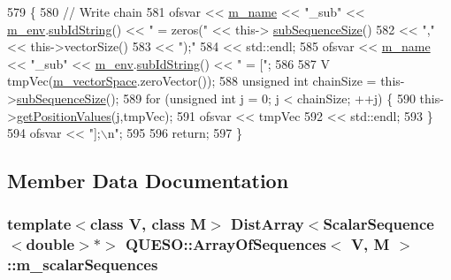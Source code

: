 \begin{DoxyCode}
579 \{
580   \textcolor{comment}{// Write chain}
581   ofsvar << \hyperlink{class_q_u_e_s_o_1_1_base_vector_sequence_a3c379b2f7c20a2a1dd083ea43fca1494}{m\_name} << \textcolor{stringliteral}{"\_sub"} << \hyperlink{class_q_u_e_s_o_1_1_base_vector_sequence_a8e8824d2a63c5a43bcc6473e3a0491e8}{m\_env}.\hyperlink{class_q_u_e_s_o_1_1_base_environment_a73f7849acdd5d5ba15a3094fe18f258f}{subIdString}() << \textcolor{stringliteral}{" = zeros("} << this->
      \hyperlink{class_q_u_e_s_o_1_1_array_of_sequences_a007d00d2398007b9bac82ed23eedb1e2}{subSequenceSize}()
582          << \textcolor{stringliteral}{","}                                                    << this->vectorSize()
583          << \textcolor{stringliteral}{");"}
584          << std::endl;
585   ofsvar << \hyperlink{class_q_u_e_s_o_1_1_base_vector_sequence_a3c379b2f7c20a2a1dd083ea43fca1494}{m\_name} << \textcolor{stringliteral}{"\_sub"} << \hyperlink{class_q_u_e_s_o_1_1_base_vector_sequence_a8e8824d2a63c5a43bcc6473e3a0491e8}{m\_env}.\hyperlink{class_q_u_e_s_o_1_1_base_environment_a73f7849acdd5d5ba15a3094fe18f258f}{subIdString}() << \textcolor{stringliteral}{" = ["};
586 
587   V tmpVec(\hyperlink{class_q_u_e_s_o_1_1_base_vector_sequence_a4bd171e39ed050ff105c808336f35198}{m\_vectorSpace}.zeroVector());
588   \textcolor{keywordtype}{unsigned} \textcolor{keywordtype}{int} chainSize = this->\hyperlink{class_q_u_e_s_o_1_1_array_of_sequences_a007d00d2398007b9bac82ed23eedb1e2}{subSequenceSize}();
589   \textcolor{keywordflow}{for} (\textcolor{keywordtype}{unsigned} \textcolor{keywordtype}{int} j = 0; j < chainSize; ++j) \{
590     this->\hyperlink{class_q_u_e_s_o_1_1_array_of_sequences_ae75a2eedab5e8d3fc0638f578eba35ab}{getPositionValues}(j,tmpVec);
591     ofsvar << tmpVec
592            << std::endl;
593   \}
594   ofsvar << \textcolor{stringliteral}{"];\(\backslash\)n"};
595 
596   \textcolor{keywordflow}{return};
597 \}
\end{DoxyCode}


\subsection{Member Data Documentation}
\hypertarget{class_q_u_e_s_o_1_1_array_of_sequences_a1f8047145ca75081c303bbbab5881119}{
\subsubsection[{m\-\_\-scalar\-Sequences}]{\setlength{\rightskip}{0pt plus 5cm}template$<$class V, class M$>$ {\bf Dist\-Array}$<${\bf Scalar\-Sequence}$<$double$>$$\ast$$>$ {\bf Q\-U\-E\-S\-O\-::\-Array\-Of\-Sequences}$<$ V, M $>$\-::m\-\_\-scalar\-Sequences\hspace{0.3cm}{\ttfamily [private]}}}\label{class_q_u_e_s_o_1_1_array_of_sequences_a1f8047145ca75081c303bbbab5881119}



